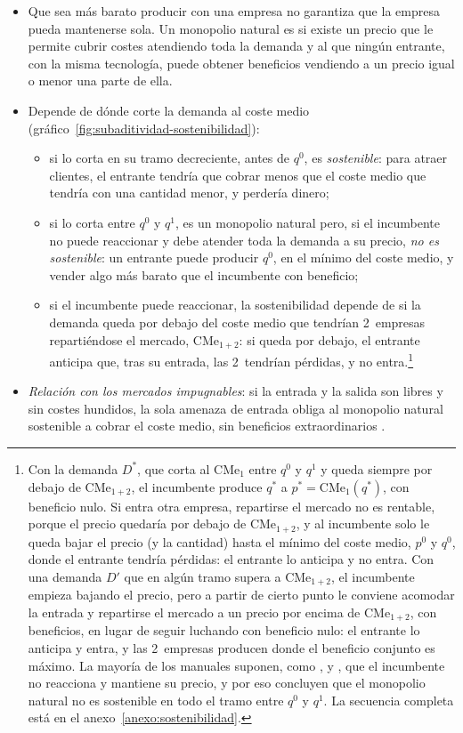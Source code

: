 \documentclass[11pt]{article}
\begin{document}
\begin{itemize}
\item Que sea más barato producir con una empresa no garantiza que la empresa pueda mantenerse sola. Un monopolio natural es  si existe un precio que le permite cubrir costes atendiendo toda la demanda y al que ningún entrante, con la misma tecnología, puede obtener beneficios vendiendo a un precio igual o menor una parte de ella\nocite{PanzarWillig1977Free,BaumolBaileyWillig1977Weak}.
\item Depende de dónde corte la demanda al coste medio (gráfico~\ref{fig:subaditividad-sostenibilidad}):
  \begin{itemize}
  \item si lo corta en su tramo decreciente, antes de $q^0$, es \emph{sostenible}: para atraer clientes, el entrante tendría que cobrar menos que el coste medio que tendría con una cantidad menor, y perdería dinero;
  \item si lo corta entre $q^0$ y $q^1$, es un monopolio natural pero, si el incumbente no puede reaccionar y debe atender toda la demanda a su precio, \emph{no es sostenible}: un entrante puede producir $q^0$, en el mínimo del coste medio, y vender algo más barato que el incumbente con beneficio;
  \item si el incumbente puede reaccionar, la sostenibilidad depende de si la demanda queda por debajo del coste medio que tendrían 2~empresas repartiéndose el mercado, $\mathrm{CMe}_{1+2}$: si queda por debajo, el entrante anticipa que, tras su entrada, las 2~tendrían pérdidas, y no entra\nocite{Segura1986Analisis}.\footnote{Con la demanda $D^{*}$, que corta al $\mathrm{CMe}_1$ entre $q^0$ y $q^1$ y queda siempre por debajo de $\mathrm{CMe}_{1+2}$, el incumbente produce $q^{*}$ a $p^{*}=\mathrm{CMe}_1(q^{*})$, con beneficio nulo. Si entra otra empresa, repartirse el mercado no es rentable, porque el precio quedaría por debajo de $\mathrm{CMe}_{1+2}$, y al incumbente solo le queda bajar el precio (y la cantidad) hasta el mínimo del coste medio, $p^0$ y $q^0$, donde el entrante tendría pérdidas: el entrante lo anticipa y no entra. Con una demanda $D'$ que en algún tramo supera a $\mathrm{CMe}_{1+2}$, el incumbente empieza bajando el precio, pero a partir de cierto punto le conviene acomodar la entrada y repartirse el mercado a un precio por encima de $\mathrm{CMe}_{1+2}$, con beneficios, en lugar de seguir luchando con beneficio nulo: el entrante lo anticipa y entra, y las 2~empresas producen donde el beneficio conjunto es máximo. La mayoría de los manuales suponen, como ,  y , que el incumbente no reacciona y mantiene su precio, y por eso concluyen que el monopolio natural no es sostenible en todo el tramo entre $q^0$ y $q^1$. La secuencia completa está en el anexo~\ref{anexo:sostenibilidad}.}
  \end{itemize}
\item \emph{Relación con los mercados impugnables}: si la entrada y la salida son libres y sin costes hundidos, la sola amenaza de entrada obliga al monopolio natural sostenible a cobrar el coste medio, sin beneficios extraordinarios\nocite{BaumolPanzarWillig1982Contestable} .
\end{itemize}
\end{document}
